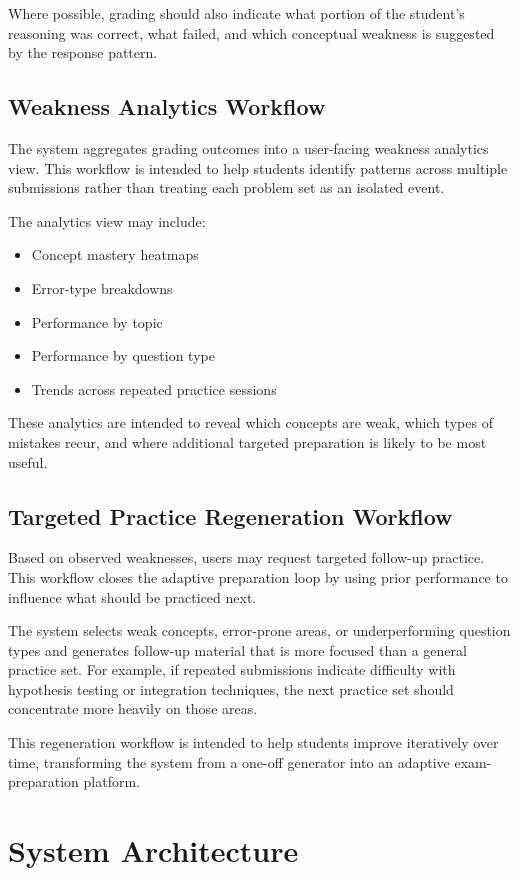 \documentclass[11pt]{article}
\begin{document}
Where possible, grading should also indicate what portion of the student's reasoning was correct, what failed, and which conceptual weakness is suggested by the response pattern.

\subsection{Weakness Analytics Workflow}
The system aggregates grading outcomes into a user-facing weakness analytics view. This workflow is intended to help students identify patterns across multiple submissions rather than treating each problem set as an isolated event.

The analytics view may include:
\begin{itemize}
\item Concept mastery heatmaps
\item Error-type breakdowns
\item Performance by topic
\item Performance by question type
\item Trends across repeated practice sessions
\end{itemize}

These analytics are intended to reveal which concepts are weak, which types of mistakes recur, and where additional targeted preparation is likely to be most useful.

\subsection{Targeted Practice Regeneration Workflow}
Based on observed weaknesses, users may request targeted follow-up practice. This workflow closes the adaptive preparation loop by using prior performance to influence what should be practiced next.

The system selects weak concepts, error-prone areas, or underperforming question types and generates follow-up material that is more focused than a general practice set. For example, if repeated submissions indicate difficulty with hypothesis testing or integration techniques, the next practice set should concentrate more heavily on those areas.

This regeneration workflow is intended to help students improve iteratively over time, transforming the system from a one-off generator into an adaptive exam-preparation platform.

\section{System Architecture}
\end{document}
